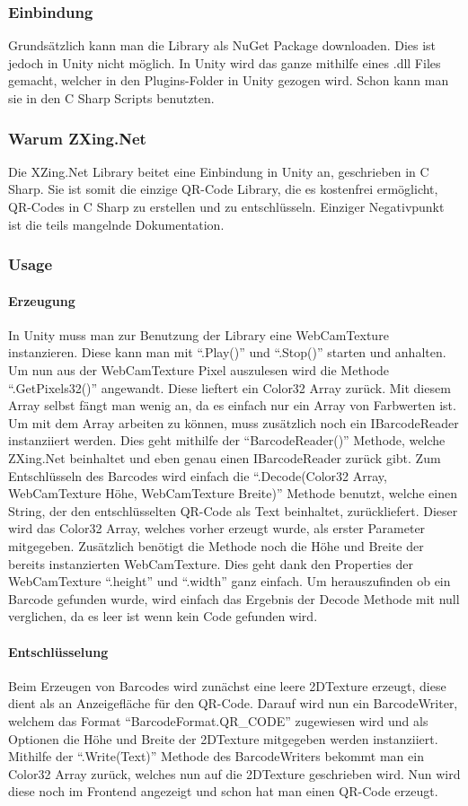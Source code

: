 \subsubsection{Einbindung}
Grundsätzlich kann man die Library als NuGet Package downloaden. Dies ist jedoch in Unity nicht möglich. In Unity wird das ganze mithilfe eines .dll Files gemacht, welcher in den Plugins-Folder in Unity gezogen wird. Schon kann man sie in den C Sharp Scripts benutzten.
\subsubsection{Warum ZXing.Net}
Die XZing.Net Library beitet eine Einbindung in Unity an, geschrieben in C Sharp. Sie ist somit die einzige QR-Code Library, die es kostenfrei ermöglicht, QR-Codes in C Sharp zu erstellen und zu entschlüsseln. Einziger Negativpunkt ist die teils mangelnde Dokumentation.
\subsubsection{Usage}
\paragraph{Erzeugung}
In Unity muss man zur Benutzung der Library eine WebCamTexture instanzieren. Diese kann man mit “.Play()” und “.Stop()” starten und anhalten. Um nun aus der WebCamTexture Pixel auszulesen wird die Methode “.GetPixels32()” angewandt. Diese lieftert ein Color32 Array zurück. Mit diesem Array selbst fängt man wenig an, da es einfach nur ein Array von Farbwerten ist. Um mit dem Array arbeiten zu können, muss zusätzlich noch ein IBarcodeReader instanziiert werden. Dies geht mithilfe der “BarcodeReader()” Methode, welche ZXing.Net beinhaltet und eben genau einen IBarcodeReader zurück gibt. Zum Entschlüsseln des Barcodes wird einfach die “.Decode(Color32 Array, WebCamTexture Höhe, WebCamTexture Breite)” Methode benutzt, welche einen String, der den entschlüsselten QR-Code als Text beinhaltet, zurückliefert. Dieser wird das Color32 Array, welches vorher erzeugt wurde, als erster Parameter mitgegeben. Zusätzlich benötigt die Methode noch die Höhe und Breite der bereits instanzierten WebCamTexture. Dies geht dank den Properties der WebCamTexture “.height” und “.width”  ganz einfach. Um herauszufinden ob ein Barcode gefunden wurde, wird einfach das Ergebnis der Decode Methode mit null verglichen, da es leer ist wenn kein Code gefunden wird.
\paragraph{Entschlüsselung}
Beim Erzeugen von Barcodes wird zunächst eine leere 2DTexture erzeugt, diese dient als an Anzeigefläche für den QR-Code. Darauf wird nun ein BarcodeWriter, welchem das Format “BarcodeFormat.QR\_CODE” zugewiesen wird und als Optionen die Höhe und Breite der 2DTexture mitgegeben werden instanziiert. Mithilfe der “.Write(Text)” Methode des BarcodeWriters bekommt man ein Color32 Array zurück, welches nun auf die 2DTexture geschrieben wird. Nun wird diese noch im Frontend angezeigt und schon hat man einen QR-Code erzeugt.
